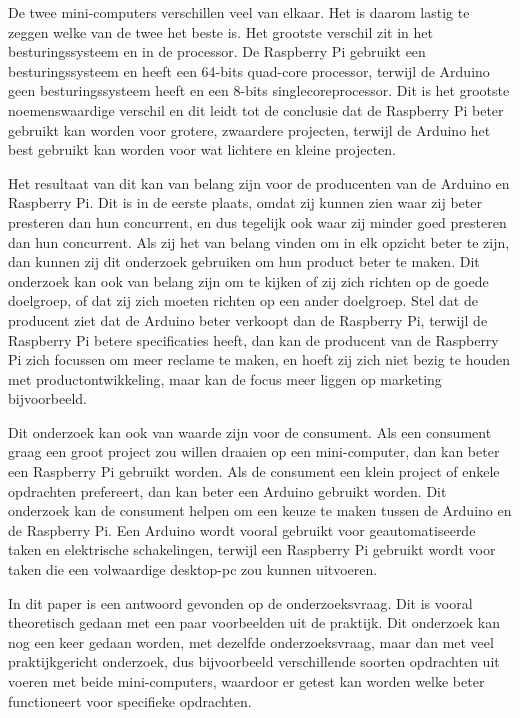 \documentclass[a4paper, dutch, abstract=true]{scrartcl}
\begin{document}
De twee mini-computers verschillen veel van elkaar.
Het is daarom lastig te zeggen welke van de twee het beste is.
Het grootste verschil zit in het besturingssysteem en in de processor.
De Raspberry Pi gebruikt een besturingssysteem en heeft een 64-bits quad-core processor, terwijl de
Arduino geen besturingssysteem heeft en een 8-bits singlecoreprocessor.
Dit is het grootste noemenswaardige verschil en dit leidt tot de conclusie dat de Raspberry Pi beter
gebruikt kan worden voor grotere, zwaardere projecten, terwijl de Arduino het best gebruikt kan
worden voor wat lichtere en kleine projecten.

Het resultaat van dit kan van belang zijn voor de producenten van de Arduino en Raspberry Pi.
Dit is in de eerste plaats, omdat zij kunnen zien waar zij beter presteren dan hun concurrent, en
dus tegelijk ook waar zij minder goed presteren dan hun concurrent.
Als zij het van belang vinden om in elk opzicht beter te zijn, dan kunnen zij dit onderzoek
gebruiken om hun product beter te maken.
Dit onderzoek kan ook van belang zijn om te kijken of zij zich richten op de goede doelgroep, of dat
zij zich moeten richten op een ander doelgroep.
Stel dat de producent ziet dat de Arduino beter verkoopt dan de Raspberry Pi, terwijl de Raspberry
Pi betere specificaties heeft, dan kan de producent van de Raspberry Pi zich focussen om meer
reclame te maken, en hoeft zij zich niet bezig te houden met productontwikkeling, maar kan de focus
meer liggen op marketing bijvoorbeeld.

Dit onderzoek kan ook van waarde zijn voor de consument.
Als een consument graag een groot project zou willen draaien op een mini-computer, dan kan beter een
Raspberry Pi gebruikt worden.
Als de consument een klein project of enkele opdrachten prefereert, dan kan beter een Arduino
gebruikt worden.
Dit onderzoek kan de consument helpen om een keuze te maken tussen de Arduino en de Raspberry Pi.
Een Arduino wordt vooral gebruikt voor geautomatiseerde taken en elektrische schakelingen, terwijl
een Raspberry Pi gebruikt wordt voor taken die een volwaardige desktop-pc zou kunnen uitvoeren.

In dit paper is een antwoord gevonden op de onderzoeksvraag.
Dit is vooral theoretisch gedaan met een paar voorbeelden uit de praktijk.
Dit onderzoek kan nog een keer gedaan worden, met dezelfde onderzoeksvraag, maar dan met veel
praktijkgericht onderzoek, dus bijvoorbeeld verschillende soorten opdrachten uit voeren met beide
mini-computers, waardoor er getest kan worden welke beter functioneert voor specifieke opdrachten.
\end{document}
